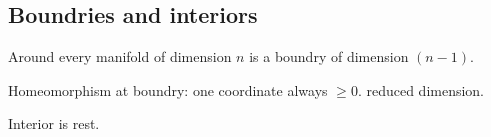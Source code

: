 
\subsection{Boundries and interiors}

Around every manifold of dimension \(n\) is a boundry of dimension \((n-1)\).

Homeomorphism at boundry: one coordinate always \(\ge 0\). reduced dimension.

Interior is rest.

